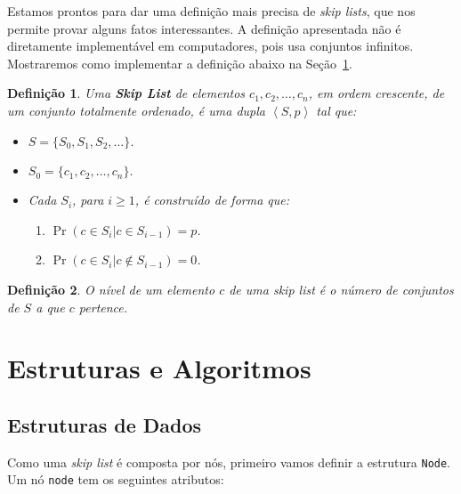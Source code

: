 \documentclass[paper=a4, fontsize=11pt]{scrartcl} %
\newtheorem{definition}{Definição}
\numberwithin{equation}{section}
\numberwithin{figure}{section}
\numberwithin{table}{section}
\numberwithin{definition}{section}
\numberwithin{theorem}{section}
\numberwithin{property}{section}
\numberwithin{proposition}{section}
\newcommand{\sls}{\textit{skip lists}\xspace}
\newcommand{\skl}{\textit{skip list}\xspace}
\renewcommand{\sl}{\textit{skip list}\xspace}
\begin{document}
Estamos prontos para dar uma definição mais precisa de \sls , que nos permite provar alguns fatos interessantes.
A definição apresentada não é diretamente implementável em computadores, pois usa conjuntos infinitos. Mostraremos
como implementar a definição abaixo na Seção~\ref{sec:estrut}.

\begin{definition}
Uma \textbf{\emph{Skip List}} de elementos $c_1, c_2, \ldots, c_n$, em ordem crescente, de um conjunto totalmente 
ordenado, é uma dupla $\left\langle S, p \right\rangle$ tal que:

\begin{itemize}

\item $S = \{S_0, S_1, S_2, \ldots \}$.

\item $S_0 = \{c_1, c_2, \ldots, c_n\}.$

\item Cada $S_i$, para $i \geq 1$, é construído de forma que:
  \begin{enumerate}[noitemsep]
    \item $\Pr(c \in S_i | c \in S_{i-1}) = p$.
    \item  $\Pr(c \in S_i | c \notin S_{i-1}) = 0$.
  \end{enumerate}

\end{itemize}

\end{definition}



\begin{definition}

O nível de um elemento $c$ de uma \sl é o número de conjuntos de $S$ a que $c$ pertence.


\end{definition}


\section{Estruturas e Algoritmos} \label{sec:estrut}


\subsection{Estruturas de Dados}

Como uma \skl é composta por nós, primeiro vamos definir a estrutura \verb|Node|. Um nó \verb|node| 
tem os seguintes atributos:
\end{document}
